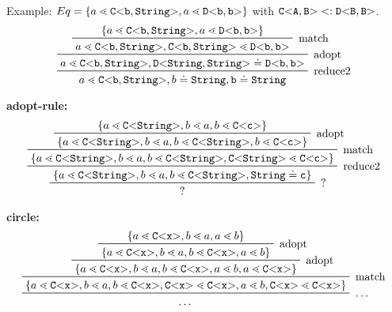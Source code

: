 Example:
$Eq = \{ a \lessdot \mathtt{C {\tt <} b,\tt{String} {\tt >} }, a \lessdot \mathtt{D {\tt <} b,b {\tt >} } \}$
with $\mathtt{C {\tt <} A,B {\tt >} } <: \mathtt{D {\tt <} B,B {\tt >} }$.
\begin{displaymath}
\prftree[r]{
    reduce2
        }{
    \prftree[r]{
        adopt
            }{
    \prftree[r]{
        match
            }{
    \set{a \lessdot \exptype{C}{b,\tt{String}}, a \lessdot \exptype{D}{b,b}}
    }{
    a \lessdot \exptype{C}{b,\tt{String}}, \exptype{C}{b,\tt{String}} \lessdot \exptype{D}{b,b}
    }
    }{
         a \lessdot \exptype{C}{b,\tt{String}}, \exptype{D}{\tt{String},\tt{String}} \doteq \exptype{D}{b,b}
    }}
    {
       a \lessdot \exptype{C}{b,\tt{String}}, b \doteq \tt{String}, b \doteq \tt{String}
        }
\end{displaymath}

\textbf{adopt-rule:}\\
\begin{displaymath}
    \prftree[r]{
        ?
    }{
\prftree[r]{
    reduce2
        }{
    \prftree[r]{
        match
            }{
    \prftree[r]{
        adopt
            }{
    \set{a \lessdot \exptype{C}{\tt{String}}, b \lessdot a, b \lessdot \exptype{C}{c}}
    }{
        \set{a \lessdot \exptype{C}{\tt{String}}, b \lessdot a, b \lessdot \exptype{C}{\tt{String}}, b \lessdot \exptype{C}{c}}
    }
    }{
        \set{a \lessdot \exptype{C}{\tt{String}}, b \lessdot a, b \lessdot \exptype{C}{\tt{String}}, \exptype{C}{\tt{String}} \lessdot \exptype{C}{c}}
    }}
    {
        \set{a \lessdot \exptype{C}{\tt{String}}, b \lessdot a, b \lessdot \exptype{C}{\tt{String}}, \tt{String} \doteq c}
    }}{
    ?
        }
\end{displaymath}


\textbf{circle:}\\
\begin{displaymath}
    \prftree[r]{
        \ldots
    }{
\prftree[r]{
    match
        }{
    \prftree[r]{
        adopt
            }{
    \prftree[r]{
        adopt
            }{
\set{a \lessdot \exptype{C}{x}, b \lessdot a, a \lessdot b}
}{
    \set{a \lessdot \exptype{C}{x}, b \lessdot a, b \lessdot \exptype{C}{x}, a \lessdot b}
}
}{
    \set{a \lessdot \exptype{C}{x}, b \lessdot a, b \lessdot \exptype{C}{x}, a \lessdot b, a \lessdot \exptype{C}{x}}
}}
{
    \set{a \lessdot \exptype{C}{x}, b \lessdot a, b \lessdot \exptype{C}{x}, \exptype{C}{x} \lessdot \exptype{C}{x}, a \lessdot b, \exptype{C}{x} \lessdot \exptype{C}{x}}
}}{
 \ldots
        }
\end{displaymath}

